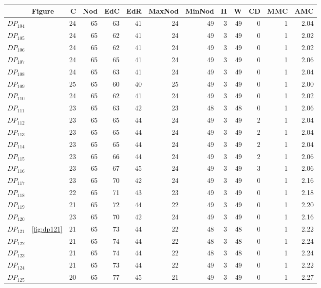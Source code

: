 \documentclass{article}
\begin{document}
\begin{center}
\begin{tabular}{llrrrrrrrrrrr}
\toprule
 & Figure & C & Nod & EdC & EdR & MaxNod & MinNod & H & W & CD & MMC & AMC \\
\midrule
$DP_{104}$ &  & 24 & 65 & 63 & 41 & 24 & 49 & 3 & 49 & 0 & 1 & 2.04 \\
$DP_{105}$ &  & 24 & 65 & 62 & 41 & 24 & 49 & 3 & 49 & 0 & 1 & 2.02 \\
$DP_{106}$ &  & 24 & 65 & 62 & 41 & 24 & 49 & 3 & 49 & 0 & 1 & 2.02 \\
$DP_{107}$ &  & 24 & 65 & 65 & 41 & 24 & 49 & 3 & 49 & 0 & 1 & 2.06 \\
$DP_{108}$ &  & 24 & 65 & 63 & 41 & 24 & 49 & 3 & 49 & 0 & 1 & 2.04 \\
$DP_{109}$ &  & 25 & 65 & 60 & 40 & 25 & 49 & 3 & 49 & 0 & 1 & 2.00 \\
$DP_{110}$ &  & 24 & 65 & 62 & 41 & 24 & 49 & 3 & 49 & 0 & 1 & 2.02 \\
$DP_{111}$ &  & 23 & 65 & 63 & 42 & 23 & 48 & 3 & 48 & 0 & 1 & 2.06 \\
$DP_{112}$ &  & 23 & 65 & 65 & 44 & 24 & 49 & 3 & 49 & 2 & 1 & 2.04 \\
$DP_{113}$ &  & 23 & 65 & 65 & 44 & 24 & 49 & 3 & 49 & 2 & 1 & 2.04 \\
$DP_{114}$ &  & 23 & 65 & 65 & 44 & 24 & 49 & 3 & 49 & 2 & 1 & 2.04 \\
$DP_{115}$ &  & 23 & 65 & 66 & 44 & 24 & 49 & 3 & 49 & 2 & 1 & 2.06 \\
$DP_{116}$ &  & 23 & 65 & 67 & 45 & 24 & 49 & 3 & 49 & 3 & 1 & 2.06 \\
$DP_{117}$ &  & 23 & 65 & 70 & 42 & 24 & 49 & 3 & 49 & 0 & 1 & 2.16 \\
$DP_{118}$ &  & 22 & 65 & 71 & 43 & 23 & 49 & 3 & 49 & 0 & 1 & 2.18 \\
$DP_{119}$ &  & 21 & 65 & 72 & 44 & 22 & 49 & 3 & 49 & 0 & 1 & 2.20 \\
$DP_{120}$ &  & 23 & 65 & 70 & 42 & 24 & 49 & 3 & 49 & 0 & 1 & 2.16 \\
$DP_{121}$ & \ref{fig:dp121} & 21 & 65 & 73 & 44 & 22 & 48 & 3 & 48 & 0 & 1 & 2.22 \\
$DP_{122}$ &  & 21 & 65 & 74 & 44 & 22 & 48 & 3 & 48 & 0 & 1 & 2.24 \\
$DP_{123}$ &  & 21 & 65 & 74 & 44 & 22 & 48 & 3 & 48 & 0 & 1 & 2.24 \\
$DP_{124}$ &  & 21 & 65 & 73 & 44 & 22 & 49 & 3 & 49 & 0 & 1 & 2.22 \\
$DP_{125}$ &  & 20 & 65 & 77 & 45 & 21 & 49 & 3 & 49 & 0 & 1 & 2.27 \\

\end{tabular}
\end{center}
\end{document}
